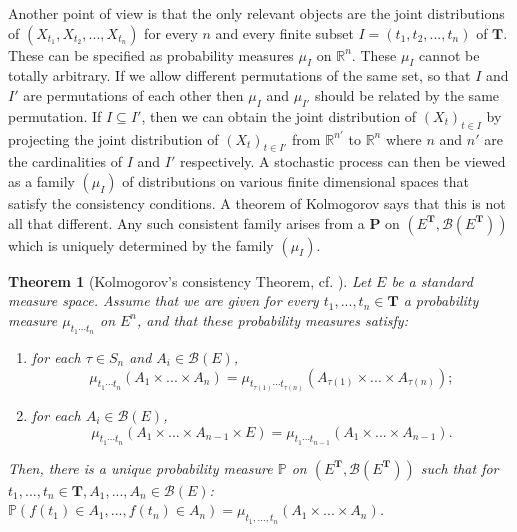 \documentclass[twoside, 12pt]{book}
\numberwithin{equation}{chapter}
\newtheorem{theorem}{Theorem}[section]
\def\cB{{\mathcal B}}
\def\mP{{\mathbb P}}
\def\mR{{\mathbb R}}
\def\bP{{\mathbf P}}
\def\bT{{\mathbf T}}
\begin{document}
	Another point of view is that the only relevant objects are the joint distributions of $(X_{t_1}, X_{t_2},... , X_{t_n})$ for every $n$ and every finite subset $I = (t_1, t_2, ... , t_n)$ of $\bT$. These can be specified as probability measures $\mu_{I}$ on $\mR^n$. These $\mu_{I}$ cannot be totally arbitrary. If we allow different permutations of the same set, so that $I$ and $I'$ are permutations of each other then $\mu_I$ and $\mu_{I'}$ should be related by the same permutation. If $I\subseteq I'$, then we can obtain the joint distribution of $(X_t)_{t\in I}$ by projecting the joint distribution of $(X_t)_{t\in I'}$ from $\mR^{n'}$ to $\mR^{n}$ where $n$ and $n'$ are the cardinalities of $I$ and $I'$ respectively. A stochastic process can then be viewed as a family $(\mu_I)$ of distributions on various finite dimensional spaces that satisfy the consistency conditions. A theorem of Kolmogorov says that this is not all that different. Any such consistent family arises from a $\bP$ on $(E^{{\bT}} , \cB(E^{\bT}))$ which is uniquely determined by the family $(\mu_I)$.
	\begin{theorem}[Kolmogorov's consistency Theorem, cf. \cite{Yan2021Measure}]\label{Thm:K1}
		Let $E$ be a standard measure space. Assume that we are given for every $t_1,...,t_n\in \bT$ a probability measure  $\mu_{t_1\cdots t_n}$ on $E^n$, and that these probability measures satisfy:
		\begin{enumerate}
			\item[(a).] for each $\tau\in S_n$ and $A_i \in \mathcal{B}(E)$, 
			$$
			\mu_{t_1\cdots t_n} (A_1 \times ... \times A_n)=\mu_{t_{\tau(1)}\cdots t_{\tau(n)}} (A_{\tau(1)} \times ... \times A_{\tau(n)});
			$$
			\item[(b).] for each $A_i \in \mathcal{B}(E)$, 
			$$
			\mu_{t_1\cdots t_n} (A_1 \times ... \times A_{n-1} \times E)=\mu_{t_1\cdots t_{n-1}} (A_1 \times ... \times A_{n-1}). 
			$$
		\end{enumerate}
		Then, there is a unique probability measure $\mP$ on $(E^{\bT}, \cB(E^{\bT}))$ such that for $t_1,...,t_n \in \bT, A_1,...,A_n \in \mathcal{B}(E)$: $\mP (f(t_1) \in A_1,...,f(t_n) \in A_n)=\mu_{t_1,...,t_n}(A_1 \times ... \times A_n)$. 
	\end{theorem}
	
\end{document}
